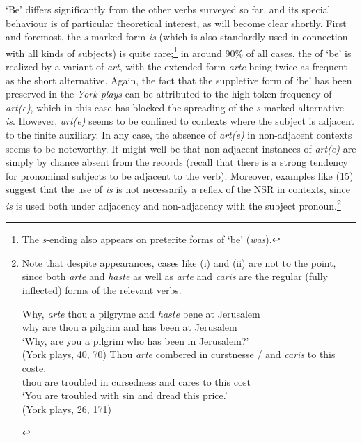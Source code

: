 \documentclass[output=paper]{langsci/langscibook}
\begin{document}
`Be' differs significantly from the other verbs surveyed so far, and its
special behaviour is of particular theoretical interest, as will become clear
shortly. First and foremost, the \emph{s}-marked form \emph{is} (which is also
standardly used in connection with all kinds of \Tsg{} subjects) is quite
rare;\footnote{The \emph{s}-ending also appears on preterite forms of ‘be’
(\emph{was}).} in around 90\% of all cases, the \Ssg{} of `be' is realized
by a variant of \emph{art}, with the extended form \emph{arte} being twice
as frequent as the short alternative. Again, the fact that the suppletive
form of \Ssg{} `be' has been preserved in the \emph{York plays} can be
attributed to the high token frequency of \emph{art(e)}, which in this case
has blocked the spreading of the \emph{s}-marked alternative \emph{is}.
However, \emph{art(e)} seems to be confined to contexts where the subject
is adjacent to the finite auxiliary. In any case, the absence of
\emph{art(e)} in non-adjacent contexts seems to be noteworthy. It
might well be that non-adjacent instances of \emph{art(e)} are simply by
chance absent from the records (recall that there is a strong tendency for
pronominal subjects to be adjacent to the verb). Moreover, examples like
(15) suggest that the use of \emph{is} is not necessarily a reflex of the\largerpage
\gls{NSR} in \Ssg{} contexts, since \emph{is} is used both under adjacency
and non-adjacency with the subject pronoun.\footnote{Note that despite
    appearances, cases like (i) and (ii) are not to the point, since both
    \emph{arte} and \emph{haste} as well as \emph{arte} and \emph{caris}
    are the regular (fully inflected) \Ssg{} forms of the relevant verbs.

    \begin{exe}
        \gll Why, \textit{arte} thou a pilgryme and \textit{haste} bene at Jerusalem \\
        why are thou a pilgrim and has been at Jerusalem\\
        \glt `Why, are you a pilgrim who has been in Jerusalem?'\\
        (York plays, 40, 70)
        \gll Thou \textit{arte} combered in curstnesse / and \textit{caris} to this coste.\\
        thou are troubled in cursedness {} and cares to this cost\\
        \glt `You are troubled with sin and dread this price.'\\
        (York plays, 26, 171)
\end{exe}}
\end{document}
